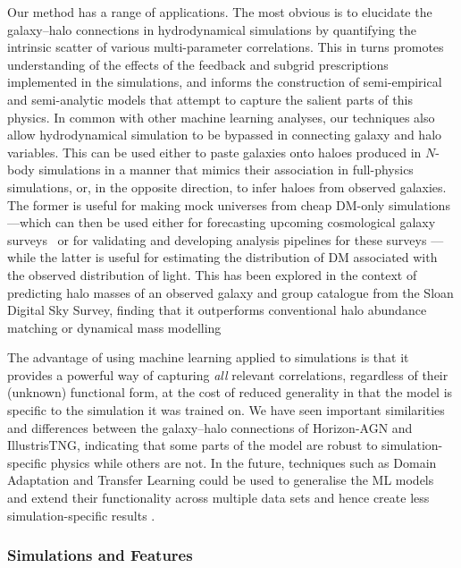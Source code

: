 \documentclass[useAMS,usenatbib]{mnras}
\begin{document}
Our method has a range of applications. The most obvious is to elucidate the galaxy--halo connections in hydrodynamical simulations by quantifying the intrinsic scatter of various multi-parameter correlations. This in turns promotes understanding of the effects of the feedback and subgrid prescriptions implemented in the simulations, and informs the construction of semi-empirical and semi-analytic models that attempt to capture the salient parts of this physics. In common with other machine learning analyses, our techniques also allow hydrodynamical simulation to be bypassed in connecting galaxy and halo variables. This can be used either to paste galaxies onto haloes produced in $N$-body simulations in a manner that mimics their association in full-physics simulations, or, in the opposite direction, to infer haloes from observed galaxies. The former is useful for making mock universes from cheap \ac{DM}-only simulations---which can then be used either for forecasting upcoming cosmological galaxy surveys~\citep[e.g.][]{Reddick_2014, Zhang_2019, Kasmanoff_2020, Wechsler2021Addgals} or for validating and developing analysis pipelines for these surveys \citep[e.g.][]{DeRose2019Buzzard}---while the latter is useful for estimating the distribution of \ac{DM} associated with the observed distribution of light. This has been explored in the context of predicting halo masses of an observed galaxy and group catalogue from the Sloan Digital Sky Survey, finding that it outperforms conventional halo abundance matching or dynamical mass modelling~\citep{Calderon_2019}

The advantage of using machine learning applied to simulations is that it provides a powerful way of capturing \emph{all} relevant correlations, regardless of their (unknown) functional form, at the cost of reduced generality in that the model is specific to the simulation it was trained on. We have seen important similarities and differences between the galaxy--halo connections of Horizon-AGN and IllustrisTNG, indicating that some parts of the model are robust to simulation-specific physics while others are not. In the future, techniques such as Domain Adaptation and Transfer Learning could be used to generalise the ML models and extend their functionality across multiple data sets and hence create less simulation-specific results \citep[e.g.][]{Ciprijanovic2021DomAdap}.


\subsubsection{Simulations and Features}
\end{document}
